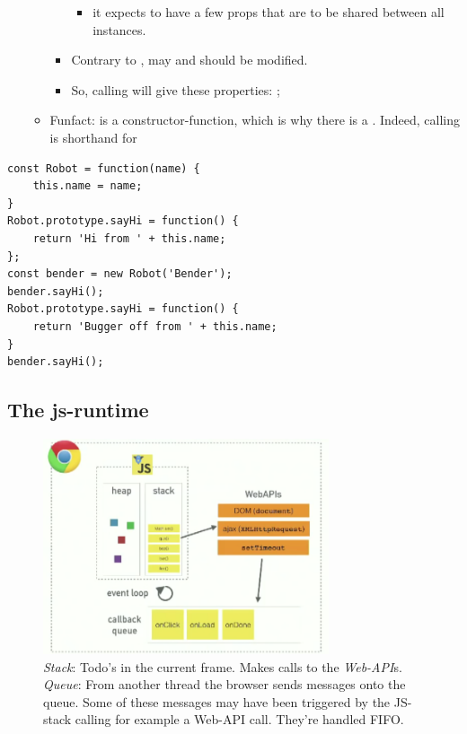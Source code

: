 \begin{itemize}
\begin{itemize}
\begin{itemize}
\begin{itemize}
                            \item it expects  to have a few props that are to be shared between all instances.
                        \end{itemize}
                    \item Contrary to ,  may and should be modified.
                    \item So, calling  will give  these properties: ;
                \end{itemize}
            \item Funfact:  is a constructor-function, which is why there is a . Indeed, calling  is shorthand for  
        \end{itemize}
\end{itemize}

\begin{lstlisting}
const Robot = function(name) {
    this.name = name;
}
Robot.prototype.sayHi = function() {
    return 'Hi from ' + this.name;
};
const bender = new Robot('Bender');
bender.sayHi();
Robot.prototype.sayHi = function() {
    return 'Bugger off from ' + this.name;
}
bender.sayHi();
\end{lstlisting}

\subsection{The js-runtime}
\begin{figure}[H] \label{js-runtime}
    \caption{\emph{Stack}: Todo's in the current frame. Makes calls to the \emph{Web-API}s. \emph{Queue}: From another thread the browser sends messages onto the queue. Some of these messages may have been triggered by the JS-stack calling for example a  Web-API call. They're handled FIFO.}
    \centering
    \includegraphics[width=0.75\textwidth]{images/js_event_loop.png}
\end{figure}

